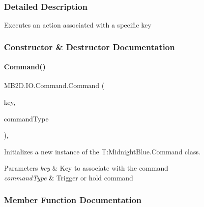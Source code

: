 \subsubsection{Detailed Description}
Executes an action associated with a specific key 



\subsubsection{Constructor \& Destructor Documentation}
\hypertarget{class_m_b2_d_1_1_i_o_1_1_command_a9cb2200e1b56437406cb300a782a425f}{}\label{class_m_b2_d_1_1_i_o_1_1_command_a9cb2200e1b56437406cb300a782a425f} 
\paragraph{\texorpdfstring{Command()}{Command()}}
{\footnotesize\ttfamily M\+B2\+D.\+I\+O.\+Command.\+Command (\begin{DoxyParamCaption}\item[{Keys}]{key,  }\item[{\hyperlink{namespace_m_b2_d_1_1_i_o_ab5f95f3fe9e652778b62bdf943168a68}{Command\+Type}}]{command\+Type }\end{DoxyParamCaption})\hspace{0.3cm}{\ttfamily [inline]}, {\ttfamily [protected]}}



Initializes a new instance of the T\+:\+Midnight\+Blue.\+Command class. 


\begin{DoxyParams}{Parameters}
{\em key} & Key to associate with the command\\
\hline
{\em command\+Type} & Trigger or hold command\\
\hline
\end{DoxyParams}


\subsubsection{Member Function Documentation}
\hypertarget{class_m_b2_d_1_1_i_o_1_1_command_a59f97dd5810dd5b112c82ad3758da7e8}{}\label{class_m_b2_d_1_1_i_o_1_1_command_a59f97dd5810dd5b112c82ad3758da7e8} 
